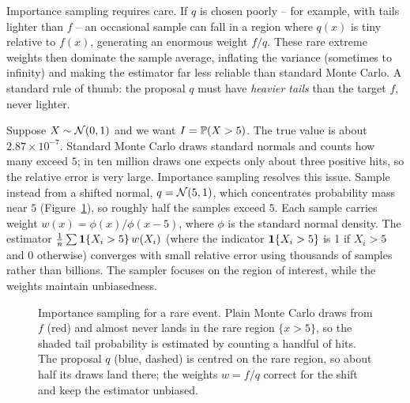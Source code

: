 \begin{trapbox}
Importance sampling requires care. If $q$ is chosen poorly -- for example, with tails
lighter than $f$ -- an occasional sample can fall in a region where $q(x)$ is tiny relative
to $f(x)$, generating an enormous weight $f/q$. These rare extreme weights then dominate
the sample average, inflating the variance (sometimes to infinity) and making the estimator
far less reliable than standard Monte Carlo. A standard rule of thumb: the proposal $q$ must
have \emph{heavier tails} than the target $f$, never lighter.
\end{trapbox}
\begin{example}
\label{ch35:ex-rare}
Suppose $X \sim \Normal(0,1)$ and we want $I = \P(X > 5)$. The true value is about
$2.87\times 10^{-7}$. Standard Monte Carlo draws standard normals and counts how many
exceed $5$; in ten million draws one expects only about three positive hits, so the
relative error is very large.
Importance sampling resolves this issue. Sample instead from a shifted normal,
$q = \Normal(5,1)$, which concentrates probability mass near $5$
(Figure~\ref{ch35:fig-importance}), so roughly half the
samples exceed $5$. Each sample carries weight $w(x) = \phi(x)/\phi(x-5)$, where
$\phi$ is the standard normal density. The estimator
$\frac1n\sum \ind\{X_i > 5\}\,w(X_i)$ (where the indicator $\ind\{X_i > 5\}$ is 1 if $X_i > 5$ and 0 otherwise) converges with small relative error
using thousands of samples rather than billions. The sampler focuses on the
region of interest, while the weights maintain unbiasedness.
\end{example}
\begin{figure}[H]
\centering
{}
\caption{Importance sampling for a rare event. Plain Monte Carlo draws from $f$
(red) and almost never lands in the rare region $\{x>5\}$, so the shaded tail
probability is estimated by counting a handful of hits. The proposal $q$ (blue,
dashed) is centred on the rare region, so about half its draws land there; the
weights $w=f/q$ correct for the shift and keep the estimator unbiased.}
\label{ch35:fig-importance}
\end{figure}
